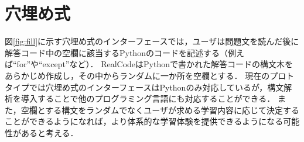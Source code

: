 \section{穴埋め式}

図\ref{fig:fill}に示す穴埋め式のインターフェースでは，ユーザは問題文を読んだ後に解答コード中の空欄に該当するPythonのコードを記述する（例えば``for''や``except''など）．
RealCodeはPythonで書かれた解答コードの構文木をあらかじめ作成し，その中からランダムに一か所を空欄とする．
現在のプロトタイプでは穴埋め式のインターフェースはPythonのみ対応しているが，構文解析を導入することで他のプログラミング言語にも対応することができる．
また，空欄とする構文をランダムでなくユーザが求める学習内容に応じて決定することができるようになれば，より体系的な学習体験を提供できるようになる可能性があると考える．


